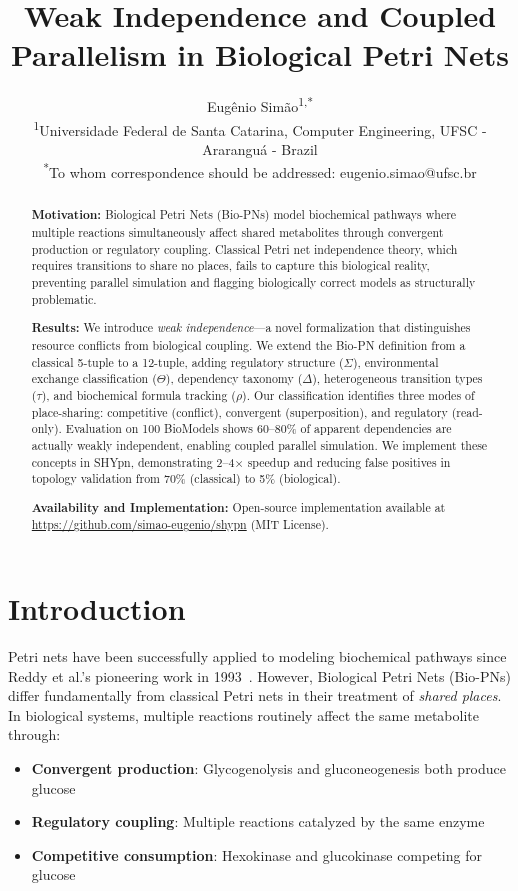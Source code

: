 \documentclass{article}
\title{\textbf{Weak Independence and Coupled Parallelism in Biological Petri Nets}}
\author{
Eugênio Simão\textsuperscript{1,*}\\
\textsuperscript{1}Universidade Federal de Santa Catarina, Computer Engineering, UFSC - Araranguá - Brazil\\
\textsuperscript{*}To whom correspondence should be addressed: eugenio.simao@ufsc.br
}
\date{}
\begin{document}
\maketitle

\begin{abstract}
\textbf{Motivation:} Biological Petri Nets (Bio-PNs) model biochemical pathways where multiple reactions simultaneously affect shared metabolites through convergent production or regulatory coupling. Classical Petri net independence theory, which requires transitions to share no places, fails to capture this biological reality, preventing parallel simulation and flagging biologically correct models as structurally problematic.

\textbf{Results:} We introduce \emph{weak independence}---a novel formalization that distinguishes resource conflicts from biological coupling. We extend the Bio-PN definition from a classical 5-tuple to a 12-tuple, adding regulatory structure ($\Sigma$), environmental exchange classification ($\Theta$), dependency taxonomy ($\Delta$), heterogeneous transition types ($\tau$), and biochemical formula tracking ($\rho$). Our classification identifies three modes of place-sharing: competitive (conflict), convergent (superposition), and regulatory (read-only). Evaluation on 100 BioModels shows 60--80\% of apparent dependencies are actually weakly independent, enabling coupled parallel simulation. We implement these concepts in SHYpn, demonstrating 2--4$\times$ speedup and reducing false positives in topology validation from 70\% (classical) to 5\% (biological).

\textbf{Availability and Implementation:} Open-source implementation available at \url{https://github.com/simao-eugenio/shypn} (MIT License).
\end{abstract}

\section{Introduction}

Petri nets have been successfully applied to modeling biochemical pathways since Reddy et al.'s pioneering work in 1993~\cite{Reddy1993}. However, Biological Petri Nets (Bio-PNs) differ fundamentally from classical Petri nets in their treatment of \emph{shared places}. In biological systems, multiple reactions routinely affect the same metabolite through:
\begin{itemize}
    \item \textbf{Convergent production}: Glycogenolysis and gluconeogenesis both produce glucose
    \item \textbf{Regulatory coupling}: Multiple reactions catalyzed by the same enzyme
    \item \textbf{Competitive consumption}: Hexokinase and glucokinase competing for glucose
\end{itemize}
\end{document}
